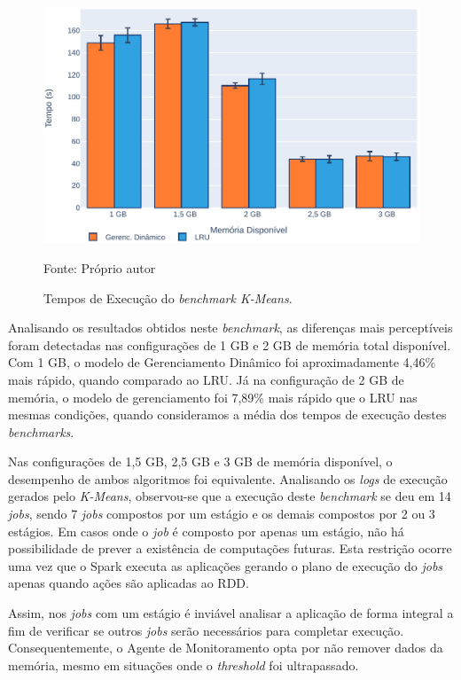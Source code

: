 \begin{figure}[!ht]
    \caption{Tempos de Execução do \textit{benchmark K-Means}.}
    \begin{center}
        \includegraphics[scale=1.0]{imagens/Gerenc-K-Means.pdf}
    \end{center}
    \small{Fonte: Próprio autor}
    \label{fig:arq-dinamica-kmeans}
\end{figure}

Analisando os resultados obtidos neste \textit{benchmark}, as diferenças mais perceptíveis foram detectadas nas configurações de 1 GB e 2 GB de memória total disponível. Com 1 GB, o modelo de Gerenciamento Dinâmico foi aproximadamente 4,46\% mais rápido, quando comparado ao LRU. Já na configuração de 2 GB de memória, o modelo de gerenciamento foi 7,89\% mais rápido que o LRU nas mesmas condições, quando consideramos a média dos tempos de execução destes \textit{benchmarks}. 

Nas configurações de 1,5 GB, 2,5 GB e 3 GB de memória disponível, o desempenho de ambos algoritmos foi equivalente. Analisando os \textit{logs} de execução gerados pelo \textit{K-Means}, observou-se que a execução deste \textit{benchmark} se deu em 14 \textit{jobs}, sendo 7 \textit{jobs} compostos por um estágio e os demais compostos por 2 ou 3 estágios. Em casos onde o \textit{job} é composto por apenas um  estágio, não há possibilidade de prever a existência de computações futuras. Esta restrição ocorre uma vez que o Spark executa as aplicações gerando o plano de execução do \textit{jobs} apenas quando ações são aplicadas ao RDD.

Assim, nos \textit{jobs} com um estágio é inviável analisar a aplicação de forma integral a fim de verificar se outros \textit{jobs} serão necessários para completar execução. Consequentemente, o Agente de Monitoramento opta por não remover dados da memória, mesmo em situações onde o \textit{threshold} foi ultrapassado.


